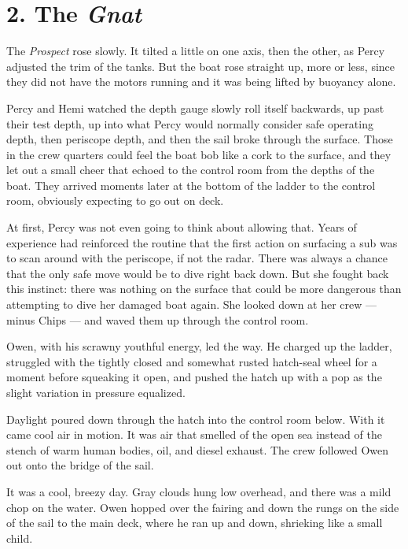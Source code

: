 \documentclass[
]{scrbook}
\begin{document}
\newpage

\hypertarget{the-gnat}{%
\section{\texorpdfstring{2. The
\emph{Gnat}}{2. The Gnat}}\label{the-gnat}}

The \emph{Prospect} rose slowly. It tilted a little on one axis, then
the other, as Percy adjusted the trim of the tanks. But the boat rose
straight up, more or less, since they did not have the motors running
and it was being lifted by buoyancy alone.

Percy and Hemi watched the depth gauge slowly roll itself backwards, up
past their test depth, up into what Percy would normally consider safe
operating depth, then periscope depth, and then the sail broke through
the surface. Those in the crew quarters could feel the boat bob like a
cork to the surface, and they let out a small cheer that echoed to the
control room from the depths of the boat. They arrived moments later at
the bottom of the ladder to the control room, obviously expecting to go
out on deck.

At first, Percy was not even going to think about allowing that. Years
of experience had reinforced the routine that the first action on
surfacing a sub was to scan around with the periscope, if not the radar.
There was always a chance that the only safe move would be to dive right
back down. But she fought back this instinct: there was nothing on the
surface that could be more dangerous than attempting to dive her damaged
boat again. She looked down at her crew --- minus Chips --- and waved
them up through the control room.

Owen, with his scrawny youthful energy, led the way. He charged up the
ladder, struggled with the tightly closed and somewhat rusted hatch-seal
wheel for a moment before squeaking it open, and pushed the hatch up
with a pop as the slight variation in pressure equalized.

Daylight poured down through the hatch into the control room below. With
it came cool air in motion. It was air that smelled of the open sea
instead of the stench of warm human bodies, oil, and diesel exhaust. The
crew followed Owen out onto the bridge of the sail.

It was a cool, breezy day. Gray clouds hung low overhead, and there was
a mild chop on the water. Owen hopped over the fairing and down the
rungs on the side of the sail to the main deck, where he ran up and
down, shrieking like a small child.
\end{document}
